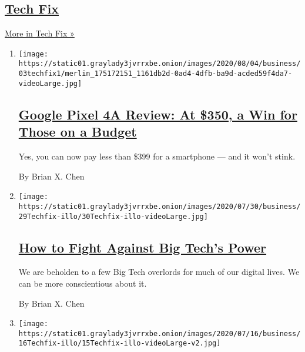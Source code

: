 \hypertarget{tech-fix}{%
\subsection{\texorpdfstring{\href{/column/tech-fix}{Tech
Fix}}{Tech Fix}}\label{tech-fix}}

\href{/column/tech-fix}{More in Tech Fix »}

\begin{enumerate}
\def\labelenumi{\arabic{enumi}.}
\item
  \texttt{[image: https://static01.graylady3jvrrxbe.onion/images/2020/08/04/business/03techfix1/merlin\_175172151\_1161db2d-0ad4-4dfb-ba9d-acded59f4da7-videoLarge.jpg]}

  \hypertarget{google-pixel-4a-review-at-350-a-win-for-those-on-a-budget}{%
  \subsection{\texorpdfstring{\href{/2020/08/03/technology/personaltech/google-pixel-4a-review.html}{Google
  Pixel 4A Review: At \$350, a Win for Those on a
  Budget}}{Google Pixel 4A Review: At \$350, a Win for Those on a Budget}}\label{google-pixel-4a-review-at-350-a-win-for-those-on-a-budget}}

  Yes, you can now pay less than \$399 for a smartphone --- and it won't
  stink.

  By Brian X. Chen
\item
  \texttt{[image: https://static01.graylady3jvrrxbe.onion/images/2020/07/30/business/29Techfix-illo/30Techfix-illo-videoLarge.jpg]}

  \hypertarget{how-to-fight-against-big-techs-power}{%
  \subsection{\texorpdfstring{\href{/2020/07/29/technology/personaltech/big-tech-power-how-to-fight.html}{How
  to Fight Against Big Tech's
  Power}}{How to Fight Against Big Tech's Power}}\label{how-to-fight-against-big-techs-power}}

  We are beholden to a few Big Tech overlords for much of our digital
  lives. We can be more conscientious about it.

  By Brian X. Chen
\item
  \texttt{[image: https://static01.graylady3jvrrxbe.onion/images/2020/07/16/business/16Techfix-illo/15Techfix-illo-videoLarge-v2.jpg]}

  \hypertarget{youre-doomscrolling-again-heres-how-to-snap-out-of-it}{%
}
\end{enumerate}
